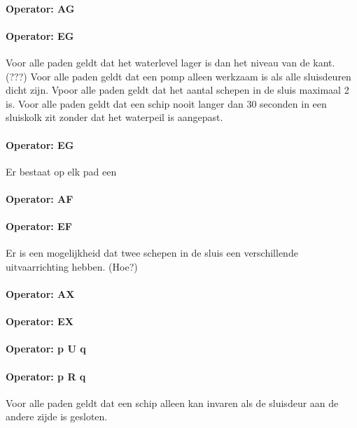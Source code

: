 \documentclass{article}
\begin{document}
	\paragraph{Operator: AG}

	\paragraph{Operator: EG}
	

	Voor alle paden geldt dat het  waterlevel lager is dan het  niveau van de kant. (???)
	Voor alle paden geldt dat een pomp alleen werkzaam is als alle sluisdeuren dicht zijn.
	Vpoor alle paden geldt dat het aantal schepen in de sluis maximaal 2 is.
	Voor alle paden  geldt dat een schip nooit langer dan 30 seconden in een sluiskolk zit zonder dat het waterpeil is aangepast.
	\paragraph{Operator: EG}
	Er bestaat op elk pad een 

	\paragraph{Operator: AF}
	
	\paragraph{Operator: EF}
	Er is een mogelijkheid dat twee schepen in de sluis een verschillende uitvaarrichting hebben. (Hoe?)
	\paragraph{Operator: AX}

	
	\paragraph{Operator: EX}
	
	\paragraph{Operator: p U q}
	
	\paragraph{Operator: p R q}
	

	Voor alle paden geldt dat een schip alleen kan invaren als de sluisdeur aan de andere zijde is gesloten.
\end{document}

